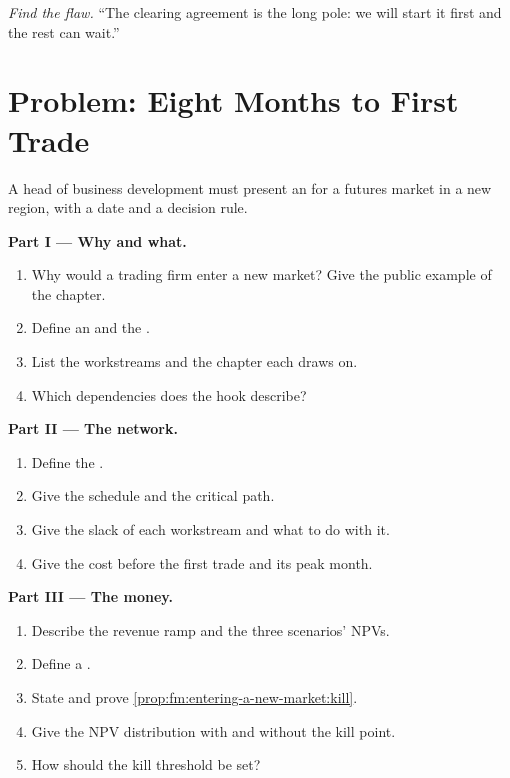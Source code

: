 \begin{exercise}[$\star\star\star$]\label{exo:fm:entering-a-new-market:8}
\emph{Find the flaw.} ``The clearing agreement is the long pole: we will start it first and the rest can wait.''
\end{exercise}

\section{Problem: Eight Months to First Trade}

\begin{problem}\label{pb:fm:entering-a-new-market:1}
A head of business development must present an  for a futures market in a new region, with a date and a decision rule.

\medskip\noindent\textbf{Part I --- Why and what.}
\begin{enumerate}
\item Why would a trading firm enter a new market? Give the public example of the chapter.
\item Define an  and the .
\item List the workstreams and the chapter each draws on.
\item Which dependencies does the hook describe?
\end{enumerate}

\medskip\noindent\textbf{Part II --- The network.}
\begin{enumerate}[resume]
\item Define the .
\item Give the schedule and the critical path.
\item Give the slack of each workstream and what to do with it.
\item Give the cost before the first trade and its peak month.
\end{enumerate}

\medskip\noindent\textbf{Part III --- The money.}
\begin{enumerate}[resume]
\item Describe the revenue ramp and the three scenarios' NPVs.
\item Define a .
\item State and prove \cref{prop:fm:entering-a-new-market:kill}.
\item Give the NPV distribution with and without the kill point.
\item How should the kill threshold be set?
\end{enumerate}


\end{problem}
